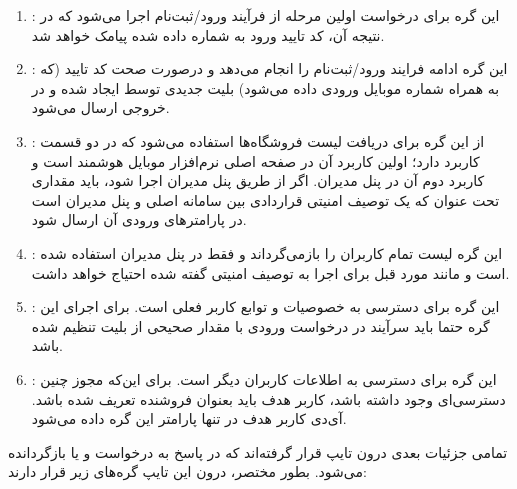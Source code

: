 \begin{enumerate}
	\item {}: این گره برای درخواست اولین مرحله از فرآیند ورود/ثبت‌نام اجرا می‌شود که در نتیجه آن، کد تایید ورود به شماره داده شده پیامک خواهد شد.
	\item {}: این گره ادامه فرایند ورود/ثبت‌نام را انجام می‌دهد و درصورت صحت کد تایید (که به همراه شماره موبایل ورودی داده می‌شود) بلیت جدیدی توسط  ایجاد شده و در خروجی ارسال می‌شود.
	\item {}: از این گره برای دریافت لیست فروشگاه‌ها استفاده می‌شود که در دو قسمت کاربرد دارد؛ اولین کاربرد آن در صفحه اصلی نرم‌افزار موبایل هوشمند است و کاربرد دوم آن در پنل مدیران. اگر از طریق پنل مدیران اجرا شود، باید مقداری تحت عنوان  که یک توصیف امنیتی قراردادی بین سامانه اصلی و پنل مدیران است در پارامترهای ورودی آن ارسال شود.
	\item {}: این گره لیست تمام کاربران را بازمی‌گرداند و فقط در پنل مدیران استفاده شده است و مانند مورد قبل برای اجرا به توصیف امنیتی گفته شده احتیاج خواهد داشت.
	\item {}: این گره برای دسترسی به خصوصیات و توابع کاربر فعلی است. برای اجرای این گره حتما باید سرآیند  در درخواست ورودی با مقدار صحیحی از بلیت  تنظیم شده باشد.
	\item {}: این گره برای دسترسی به اطلاعات کاربران دیگر است. برای این‌که مجوز چنین دسترسی‌ای وجود داشته باشد، کاربر هدف باید بعنوان فروشنده تعریف شده باشد. آی‌دی کاربر هدف در تنها پارامتر این گره داده می‌شود.
\end{enumerate}

تمامی جزئیات بعدی درون تایپ  قرار گرفته‌اند که در پاسخ به درخواست  و یا  بازگردانده می‌شود. بطور مختصر، درون این تایپ گره‌های زیر قرار دارند:

